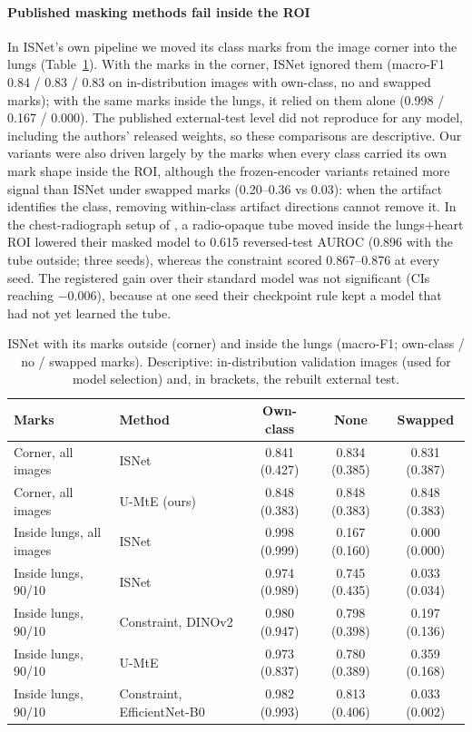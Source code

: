 \paragraph{Published masking methods fail inside the ROI} In ISNet's own pipeline \citep{bassi2024isnet} we moved its
class marks from the image corner into the lungs (Table~\ref{tab:repl_isnet}). With the marks in the corner, ISNet ignored
them (macro-F1 0.84 / 0.83 / 0.83 on in-distribution images with own-class, no and swapped marks); with the same marks
inside the lungs, it relied on them alone (0.998 / 0.167 / 0.000). The published external-test level did not reproduce
for any model, including the authors' released weights, so these comparisons are descriptive. Our variants were
also driven largely by the marks when every class carried its own mark shape inside the ROI, although the frozen-encoder
variants retained more signal than ISNet under swapped marks (0.20--0.36 vs 0.03): when the artifact identifies the class,
removing within-class artifact directions cannot remove it. In the chest-radiograph setup of \citet{viviano2021saliency},
a radio-opaque tube moved inside the lungs+heart ROI lowered their masked model to 0.615 reversed-test AUROC (0.896 with
the tube outside; three seeds), whereas the constraint scored 0.867--0.876 at every seed. The registered gain over their
standard model was not significant (CIs reaching $-0.006$), because at one seed their checkpoint rule kept a model that
had not yet learned the tube.

\begin{table}[t]\centering\small
\caption{ISNet with its marks outside (corner) and inside the lungs (macro-F1; own-class / no / swapped marks).
Descriptive: in-distribution validation images (used for model selection) and, in brackets, the rebuilt external
test.}\label{tab:repl_isnet}
\begin{tabular}{llccc}\toprule
Marks & Method & Own-class & None & Swapped\\\midrule
Corner, all images & ISNet & 0.841 (0.427) & 0.834 (0.385) & 0.831 (0.387)\\
Corner, all images & U-MtE (ours) & 0.848 (0.383) & 0.848 (0.383) & 0.848 (0.383)\\
Inside lungs, all images & ISNet & 0.998 (0.999) & 0.167 (0.160) & 0.000 (0.000)\\
Inside lungs, 90/10 & ISNet & 0.974 (0.989) & 0.745 (0.435) & 0.033 (0.034)\\
Inside lungs, 90/10 & Constraint, DINOv2 & 0.980 (0.947) & 0.798 (0.398) & 0.197 (0.136)\\
Inside lungs, 90/10 & U-MtE & 0.973 (0.837) & 0.780 (0.389) & 0.359 (0.168)\\
Inside lungs, 90/10 & Constraint, EfficientNet-B0 & 0.982 (0.993) & 0.813 (0.406) & 0.033 (0.002)\\
\bottomrule\end{tabular}\end{table}

